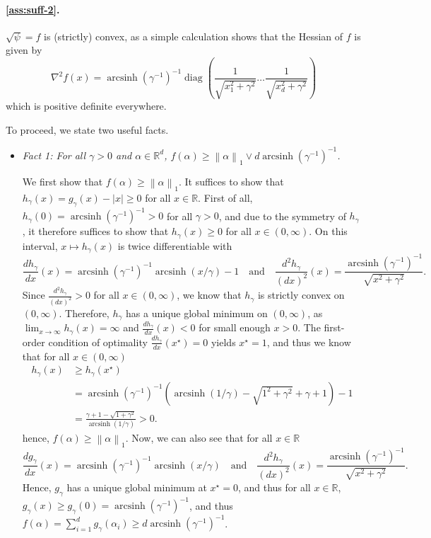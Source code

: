 \documentclass[a4paper]{article}
\newcommand{\pr}[1]{\left(#1\right)}
\newcommand{\abs}[1]{\left\lvert#1\right\rvert}
\newcommand{\norm}[1]{\left\|#1\right\|}
\newcommand{\RR}[0]{\mathbb{R}}
\DeclareMathOperator{\arcsinh}{arcsinh}
\DeclareMathOperator{\diagOp}{diag}
\newcommand{\diag}[0]{{\diagOp}}
\theoremstyle{thmstyle}
\theoremstyle{defstyle}
\theoremstyle{remark}
\begin{document}
\paragraph{\ref{ass:suff-2}.}
$\sqrt{\psi}=f$ is (strictly) convex, as a simple calculation \citep{Ghai2020} shows that the Hessian of $f$ is given by
\begin{equation*}
    \nabla^2 f(x) = \arcsinh(\gamma^{-1})^{-1} \diag\pr{\frac{1}{\sqrt{x_1^2+\gamma^2}} \dots \frac{1}{\sqrt{x_d^2+\gamma^2}}}
\end{equation*}
which is positive definite everywhere.

To proceed, we state two useful facts.
\begin{itemize}
    \item 
\emph{Fact 1: For all $\gamma>0$ and $\alpha\in \RR^d$, $f(\alpha)\geq \norm{\alpha}_1\vee d \arcsinh (\gamma^{-1})^{-1}$.}

We first show that $f(\alpha)\geq \norm{\alpha}_1$. It suffices to show that $h_\gamma(x)=g_\gamma(x)-\abs{x}\geq 0$ for all $x\in\RR$. First of all, $h_\gamma(0)=\arcsinh\pr{\gamma^{-1}}^{-1}>0$ for all $\gamma>0$, and due to the symmetry of $h_\gamma$, it therefore suffices to show that $ h_\gamma(x)\geq 0$ for all $x\in(0,\infty)$. On this interval, $x\mapsto h_\gamma(x)$ is twice differentiable with
\begin{equation*}
    \frac{dh_\gamma}{dx}(x)=\arcsinh\pr{\gamma^{-1}}^{-1}\arcsinh\pr{x/\gamma}-1 \quad \text{and}\quad \frac{d^2h_\gamma}{(dx)^2}(x)= \frac{\arcsinh\pr{\gamma^{-1}}^{-1}}{\sqrt{x^2+\gamma^2}}.
\end{equation*}
Since $\frac{d^2h_\gamma}{(dx)^2}>0$ for all $x\in(0,\infty)$, we know that $h_\gamma$ is strictly convex on $(0,\infty)$. Therefore, $h_\gamma$ has a unique global minimum on $(0,\infty)$, as $\lim_{x\to\infty}h_\gamma(x)=\infty$ and $\frac{dh_\gamma}{dx}(x)<0$ for small enough $x>0$. The first-order condition of optimality $\frac{dh_\gamma}{dx}(x^\star)=0$ yields $x^\star=1$, and thus we know that for all $x\in(0,\infty)$
\begin{align*}
    h_\gamma(x)&\geq h_\gamma(x^\star)\\
    &=\arcsinh\pr{\gamma^{-1}}^{-1}\pr{ \arcsinh\pr{1/\gamma}-\sqrt{1^2+\gamma^2}+\gamma+1}-1\\
    &=\frac{\gamma+1-\sqrt{1+\gamma^2}}{\arcsinh(1/\gamma)}>0.
\end{align*}
hence, $f(\alpha)\geq \norm{\alpha}_1$.
Now, we can also see that for all $x\in\RR$
\begin{equation*}
    \frac{dg_\gamma}{dx}(x)=\arcsinh\pr{\gamma^{-1}}^{-1}\arcsinh\pr{x/\gamma} \quad \text{and} \quad \frac{d^2h_\gamma}{(dx)^2}(x)= \frac{\arcsinh\pr{\gamma^{-1}}^{-1}}{\sqrt{x^2+\gamma^2}}.
\end{equation*}
Hence, $g_\gamma$ has a unique global minimum at $x^\star = 0$, and thus for all $x\in\RR$, $g_\gamma(x)\geq g_\gamma(0) = \arcsinh (\gamma^{-1})^{-1}$, and thus
$f(\alpha)=\sum_{i=1}^d g_\gamma(\alpha_i)\geq d \arcsinh (\gamma^{-1})^{-1}$.


\end{itemize}
\end{document}
